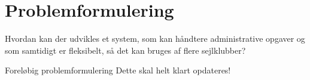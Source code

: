 \chapter{Problemformulering}\label{chap:problemformulering}

\cbstart

Hvordan kan der udvikles et system, som kan håndtere administrative opgaver og som samtidigt er fleksibelt, så det kan bruges af flere sejlklubber?

\begin{anfxnote}{Foreløbig problemformulering}
  Dette skal helt klart opdateres!
\end{anfxnote}

\cbend
